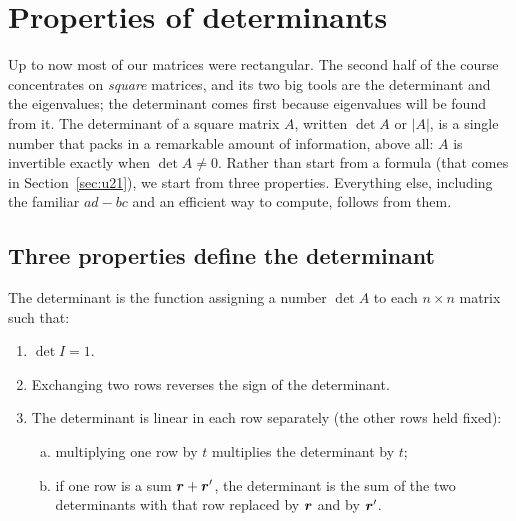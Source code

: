 \section{Properties of determinants}\label{sec:u20}

Up to now most of our matrices were rectangular. The second half of the course concentrates on
\emph{square} matrices, and its two big tools are the determinant and the eigenvalues; the
determinant comes first because eigenvalues will be found from it. The determinant of a
square matrix $A$, written $\det A$ or $|A|$, is a single number that packs in a remarkable
amount of information, above all: $A$ is invertible exactly when $\det A\neq 0$. Rather than
start from a formula (that comes in Section~\ref{sec:u21}), we start from three properties.
Everything else, including the familiar $ad-bc$ and an efficient way to compute, follows from
them.

\subsection{Three properties define the determinant}

\begin{definition}\label{def:u20-det}
The determinant is the function assigning a number $\det A$ to each $n\times n$ matrix such
that:
\begin{enumerate}[1.]
  \item $\det I=1$.
  \item Exchanging two rows reverses the sign of the determinant.
  \item The determinant is linear in each row separately (the other rows held fixed):
    \begin{enumerate}[(a)]
      \item multiplying one row by $t$ multiplies the determinant by $t$;
      \item if one row is a sum $\boldsymbol{r}+\boldsymbol{r}'$, the determinant is the sum of the two
        determinants with that row replaced by $\boldsymbol{r}$ and by $\boldsymbol{r}'$.
    \end{enumerate}
\end{enumerate}
\end{definition}

